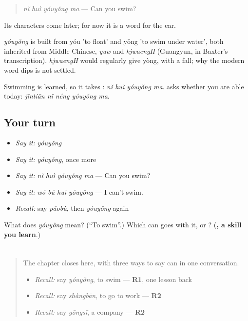 \begin{quote}
\emph{nǐ huì yóuyǒng ma} — Can you swim?
\end{quote}

Its characters come later; for now it is a word for the ear.

\begin{cousinweb}
\emph{yóuyǒng} is built from yóu 'to float' and yǒng 'to swim under water', both inherited from Middle Chinese, \emph{yuw} and \emph{hjwaengH} (Guangyun, in Baxter's transcription). \emph{hjwaengH} would regularly give yòng, with a fall; why the modern word dips is not settled.
\end{cousinweb}

\begin{grammarlens}[title={What you've built}]
Swimming is learned, so it takes : \emph{nǐ huì yóuyǒng ma}.  asks whether you are able today: \emph{jīntiān nǐ néng yóuyǒng ma}.
\end{grammarlens}

\subsection*{Your turn}
\begin{itemize}
\raggedright
  \item \emph{Say it:} \emph{yóuyǒng}
  \item \emph{Say it:} \emph{yóuyǒng}, once more
  \item \emph{Say it:} \emph{nǐ huì yóuyǒng ma} — Can you swim?
  \item \emph{Say it:} \emph{wǒ bú huì yóuyǒng} — I can't swim.
  \item \emph{Recall:} say \emph{pǎobù}, then \emph{yóuyǒng} again
\end{itemize}

\begin{tcolorbox}[breakable,colback=teal!4,colframe=teal!35!black,title={Before you move on}]
What does \emph{yóuyǒng} mean? (\textquotedblleft{}To swim\textquotedblright{}.) Which can goes with it,  or ? (\textbf{, a skill you learn}.)
\end{tcolorbox}
\section[Practice]{}

\label{lesson:ZH-C90-practice}



\begin{quote}
The chapter closes here, with three ways to say can in one conversation.

\begin{itemize}
\raggedright
  \item \emph{Recall:} say \emph{yóuyǒng}, to swim — \textbf{R1}, one lesson back
  \item \emph{Recall:} say \emph{shàngbān}, to go to work — \textbf{R2}
  \item \emph{Recall:} say \emph{gōngsī}, a company — \textbf{R2}
\end{itemize}
\end{quote}

